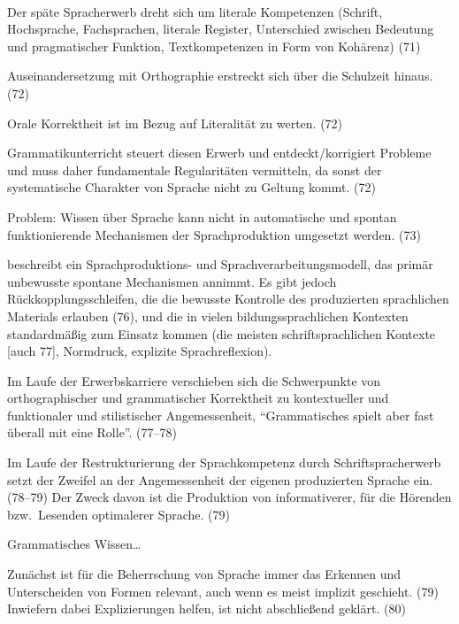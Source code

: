 \paragraph{\citet{Portmanntselikas2011}}

Der späte Spracherwerb dreht sich um literale Kompetenzen (Schrift, Hochsprache, Fachsprachen, literale Register, Unterschied zwischen Bedeutung und pragmatischer Funktion, Textkompetenzen \zB in Form von Kohärenz) (71)

Auseinandersetzung mit Orthographie erstreckt sich über die Schulzeit hinaus. (72)

Orale Korrektheit ist im Bezug auf Literalität zu werten. (72)

Grammatikunterricht steuert diesen Erwerb und entdeckt/korrigiert Probleme und muss daher fundamentale Regularitäten vermitteln, da sonst der systematische Charakter von Sprache nicht zu Geltung kommt. (72)

Problem: Wissen über Sprache kann nicht in automatische und spontan funktionierende Mechanismen der Sprachproduktion umgesetzt werden. (73)

\citet[75--79]{Portmanntselikas2011} beschreibt ein Sprachproduktions- und Sprachverarbeitungsmodell, das primär unbewusste spontane Mechanismen annimmt.
Es gibt jedoch Rückkopplungsschleifen, die die bewusste Kontrolle des produzierten sprachlichen Materials erlauben (76), und die in vielen bildungssprachlichen Kontexten standardmäßig zum Einsatz kommen (die meisten schriftsprachlichen Kontexte [auch 77], Normdruck, explizite Sprachreflexion).

Im Laufe der Erwerbskarriere verschieben sich die Schwerpunkte von orthographischer und grammatischer Korrektheit zu kontextueller und funktionaler und stilistischer Angemessenheit, "`Grammatisches spielt aber fast überall mit eine Rolle"'. (77--78)

Im Laufe der Restrukturierung der Sprachkompetenz durch Schriftspracherwerb setzt der Zweifel an der Angemessenheit der eigenen produzierten Sprache ein. (78--79)
Der Zweck davon ist die Produktion von informativerer, für die Hörenden bzw.\ Lesenden optimalerer Sprache. (79)

Grammatisches Wissen\ldots

Zunächst ist für die Beherrschung von Sprache immer das Erkennen und Unterscheiden von Formen relevant, auch wenn es meist implizit geschieht. (79)
Inwiefern dabei Explizierungen helfen, ist nicht abschließend geklärt. (80)


